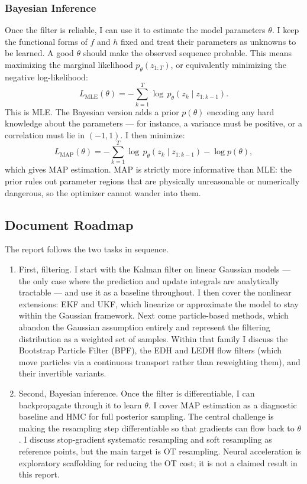 \documentclass{article}
\begin{document}
\subsubsection{Bayesian Inference}

Once the filter is reliable, I can use it to estimate the model parameters $\theta$. I keep the functional forms of $f$ and $h$ fixed and treat their parameters as unknowns to be learned. A good $\theta$ should make the observed sequence probable. This means maximizing the marginal likelihood $p_\theta(z_{1:T})$, or equivalently minimizing the negative log-likelihood:
\begin{equation}
    L_{\mathrm{MLE}}(\theta) = -\sum_{k=1}^{T} \log \, p_\theta(z_k \mid z_{1:k-1}).
\end{equation}
This is MLE. The Bayesian version adds a prior $p(\theta)$ encoding any hard knowledge about the parameters --- for instance, a variance must be positive, or a correlation must lie in $(-1, 1)$. I then minimize:
\begin{equation}
    L_{\mathrm{MAP}}(\theta) = -\sum_{k=1}^{T} \log \, p_\theta(z_k \mid z_{1:k-1}) - \log p(\theta),
\end{equation}
which gives MAP estimation. MAP is strictly more informative than MLE: the prior rules out parameter regions that are physically unreasonable or numerically dangerous, so the optimizer cannot wander into them.


\subsection{Document Roadmap}
The report follows the two tasks in sequence. 
\begin{enumerate}
\item First, filtering. I start with the Kalman filter on linear Gaussian models --- the only case where the prediction and update integrals are analytically tractable --- and use it as a baseline throughout. I then cover the nonlinear extensions: EKF and UKF, which linearize or approximate the model to stay within the Gaussian framework. Next come particle-based methods, which abandon the Gaussian assumption entirely and represent the filtering distribution as a weighted set of samples. Within that family I discuss the Bootstrap Particle Filter (BPF), the EDH and LEDH flow filters (which move particles via a continuous transport rather than reweighting them), and their invertible variants. 
\item Second, Bayesian inference. Once the filter is differentiable, I can backpropagate through it to learn $\theta$. I cover MAP estimation as a diagnostic baseline and HMC for full posterior sampling. The central challenge is making the resampling step differentiable so that gradients can flow back to $\theta$. I discuss stop-gradient systematic resampling and soft resampling as reference points, but the main target is OT resampling. Neural acceleration is exploratory scaffolding for reducing the OT cost; it is not a claimed result in this report.
\end{enumerate}
\end{document}
